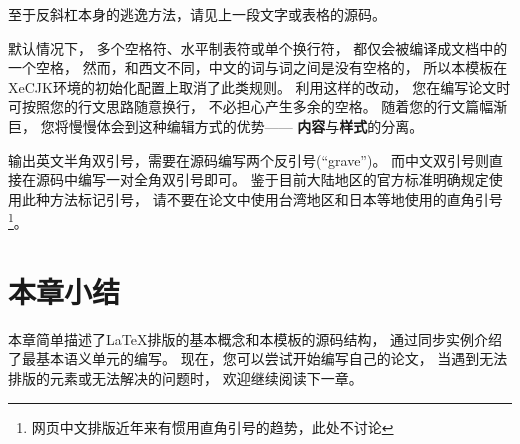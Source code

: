 至于反斜杠本身的逃逸方法，请见上一段文字或表格的源码。

默认情况下，
多个空格符、水平制表符或单个换行符，
都仅会被编译成文档中的一个空格，
然而，和西文不同，中文的词与词之间是没有空格的，
所以本模板在XeCJK环境的初始化配置上取消了此类规则。
利用这样的改动，
您在编写论文时可按照您的行文思路随意换行，
不必担心产生多余的空格。
随着您的行文篇幅渐巨，
您将慢慢体会到这种编辑方式的优势——
\textbf{内容}与\textbf{样式}的分离。

输出英文半角双引号，需要在源码编写两个反引号(``grave'')。
而中文双引号则直接在源码中编写一对全角双引号即可。
鉴于目前大陆地区的官方标准明确规定使用此种方法标记引号，
请不要在论文中使用台湾地区和日本等地使用的直角引号
\footnote{网页中文排版近年来有惯用直角引号的趋势，此处不讨论}。

\section{本章小结}
本章简单描述了\LaTeX 排版的基本概念和本模板的源码结构，
通过同步实例介绍了最基本语义单元的编写。
现在，您可以尝试开始编写自己的论文，
当遇到无法排版的元素或无法解决的问题时，
欢迎继续阅读下一章。
